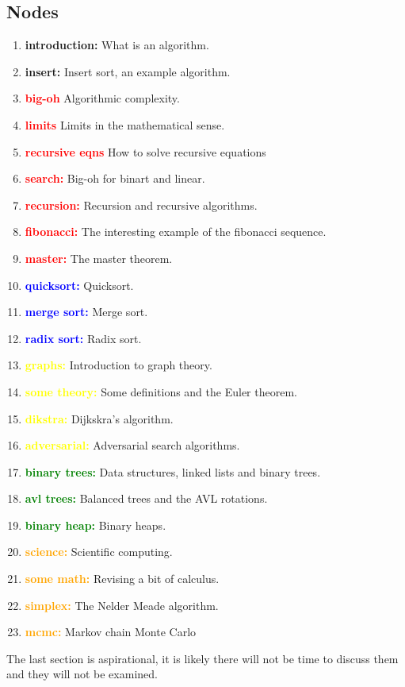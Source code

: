 \documentclass[11pt,a4paper]{scrartcl}
\begin{document}
\subsection*{Nodes}

\begin{enumerate}[label=(\alph*)]
\item \textbf{introduction:} What is an algorithm.
\item \textbf{insert:} Insert sort, an example algorithm.
\item \textbf{\textcolor{red}{big-oh}} Algorithmic complexity.
\item \textbf{\textcolor{red}{limits}} Limits in the mathematical sense.
\item \textbf{\textcolor{red}{recursive eqns}} How to solve recursive equations
\item \textbf{\textcolor{red}{search:}} Big-oh for binart and linear.
\item \textbf{\textcolor{red}{recursion:}} Recursion and recursive algorithms.
\item \textbf{\textcolor{red}{fibonacci:}} The interesting example of the fibonacci sequence. 
\item \textbf{\textcolor{red}{master:}} The master theorem.
\item \textbf{\textcolor{blue}{quicksort:}} Quicksort.
\item \textbf{\textcolor{blue}{merge sort:}} Merge sort.
\item \textbf{\textcolor{blue}{radix sort:}} Radix sort.
\item \textbf{\textcolor{yellow}{graphs:}} Introduction to graph theory.
\item \textbf{\textcolor{yellow}{some theory:}} Some definitions and the Euler theorem. 
\item \textbf{\textcolor{yellow}{dikstra:}} Dijkskra's algorithm.
\item \textbf{\textcolor{yellow}{adversarial:}} Adversarial search algorithms.
\item \textbf{\textcolor{green}{binary trees:}} Data structures, linked lists and binary trees.
\item \textbf{\textcolor{green}{avl trees:}} Balanced trees and the AVL rotations. 
\item \textbf{\textcolor{green}{binary heap:}} Binary heaps. 
\item \textbf{\textcolor{orange}{science:}} Scientific computing.
\item \textbf{\textcolor{orange}{some math:}} Revising a bit of calculus.
\item \textbf{\textcolor{orange}{simplex:}} The Nelder Meade algorithm.
\item \textbf{\textcolor{orange}{mcmc:}} Markov chain Monte Carlo

\end{enumerate}

The last section is aspirational, it is likely there will not be time to discuss them and they will not be examined.
\end{document}
